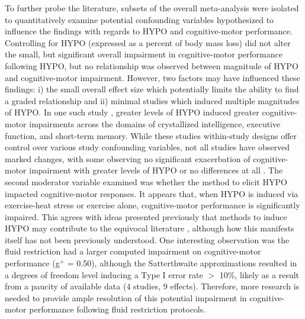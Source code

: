 To further probe the literature, subsets of the overall meta-analysis were isolated to quantitatively examine potential confounding variables hypothesized to influence the findings with regards to HYPO and cognitive-motor performance. Controlling for HYPO (expressed as a percent of body mass loss) did not alter the small, but significant overall impairment in cognitive-motor performance following HYPO, but no relationship was observed between magnitude of HYPO and cognitive-motor impairment. However, two factors may have influenced these findings: i) the small overall effect size which potentially limits the ability to find a graded relationship and ii) minimal studies which induced multiple magnitudes of HYPO. In one such study \cite{gopinathan_role_1988}, greater levels of HYPO induced greater cognitive-motor impairments across the domains of crystallized intelligence, executive function, and short-term memory. While these studies within-study designs offer control over various study confounding variables, not all studies have observed marked changes, with some observing no significant exacerbation of cognitive-motor impairment with greater levels of HYPO \cite{weber_dehydration_2013} or no differences at all \cite{baker_dehydration_2007}. The second moderator variable examined was whether the method to elicit HYPO impacted cognitive-motor responses. It appears that, when HYPO is induced via exercise-heat stress or exercise alone, cognitive-motor performance is significantly impaired. This agrees with ideas presented previously that methods to induce HYPO may contribute to the equivocal literature \cite{lieberman_methods_2012}, although how this manifests itself has not been previously understood. One interesting observation was the fluid restriction had a larger computed impairment on cognitive-motor performance (g${^+}$ = 0.50), although the Satterthwaite approximations \cite{tipton_small_2015} resulted in a degrees of freedom level inducing a Type I error rate ${>}$ 10\%, likely as a result from a paucity of available data (4 studies, 9 effects). Therefore, more research is needed to provide ample resolution of this potential impairment in cognitive-motor performance following fluid restriction protocols.    

